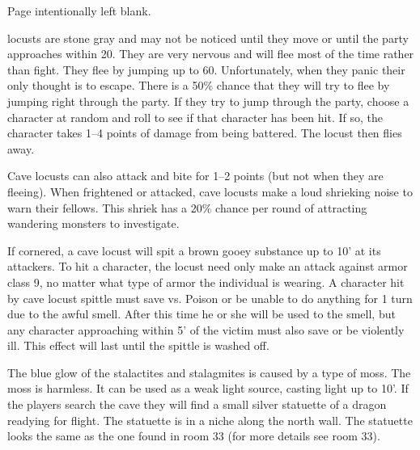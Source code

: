 \documentclass[letterpaper,serif,tightsqueeze]{module}
\begin{document}
\onecolumn

\begin{center}
Page intentionally left blank.
\end{center}

\twocolumn

locusts are stone gray and may not be noticed until they move or
until the party approaches within 20. They are very nervous and
will flee most of the time rather than fight. They flee by jumping up
to 60. Unfortunately, when they panic their only thought is to
escape. There is a 50\% chance that they will try to flee by jumping
right through the party. If they try to jump through the party,
choose a character at random and roll to see if that character has
been hit. If so, the character takes 1--4 points of damage from being
battered. The locust then flies away.

Cave locusts can also attack and bite for 1--2 points (but not when
they are fleeing). When frightened or attacked, cave locusts make
a loud shrieking noise to warn their fellows. This shriek has a 20\%
chance per round of attracting wandering monsters to investigate.

If cornered, a cave locust will spit a brown gooey substance up to
10' at its attackers. To hit a character, the locust need only make
an attack against armor class 9, no matter what type of armor the
individual is wearing. A character hit by cave locust spittle must
save vs. Poison or be unable to do anything for 1 turn due to the
awful smell. After this time he or she will be used to the smell, but
any character approaching within 5' of the victim must also save or
be violently ill. This effect will last until the spittle is washed off.

The blue glow of the stalactites and stalagmites is caused by a type
of moss. The moss is harmless. It can be used as a weak light
source, casting light up to 10'. If the players search the cave they
will find a small silver statuette of a dragon readying for flight. The
statuette is in a niche along the north wall. The statuette looks the
same as the one found in room 33 (for more details see room 33).
\end{document}
